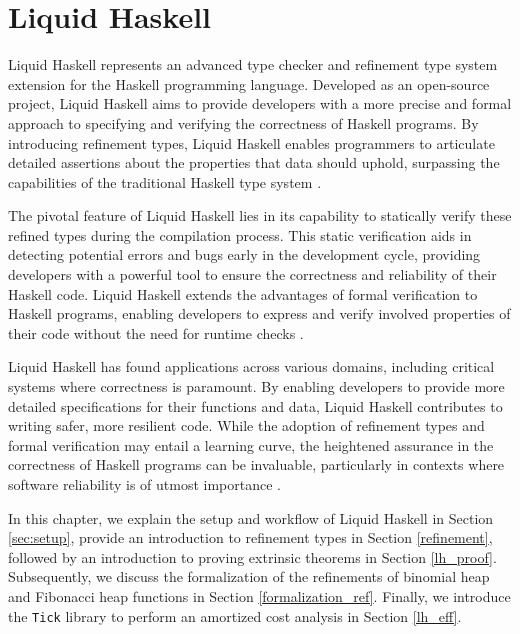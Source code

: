 \documentclass{clmthesis}
\begin{document}

\chapter{Liquid Haskell}
Liquid Haskell represents an advanced type checker and refinement type system extension for the Haskell programming language. Developed as an open-source project, Liquid Haskell aims to provide developers with a more precise and formal approach to specifying and verifying the correctness of Haskell programs. By introducing refinement types, Liquid Haskell enables programmers to articulate detailed assertions about the properties that data should uphold, surpassing the capabilities of the traditional Haskell type system \cite{vazou2014liquidhaskell}.

The pivotal feature of Liquid Haskell lies in its capability to statically verify these refined types during the compilation process. This static verification aids in detecting potential errors and bugs early in the development cycle, providing developers with a powerful tool to ensure the correctness and reliability of their Haskell code. Liquid Haskell extends the advantages of formal verification to Haskell programs, enabling developers to express and verify involved properties of their code without the need for runtime checks \cite{pena2017}.

Liquid Haskell has found applications across various domains, including critical systems where correctness is paramount. By enabling developers to provide more detailed specifications for their functions and data, Liquid Haskell contributes to writing safer, more resilient code. While the adoption of refinement types and formal verification may entail a learning curve, the heightened assurance in the correctness of Haskell programs can be invaluable, particularly in contexts where software reliability is of utmost importance \cite{vazou2014liquidhaskell}.

In this chapter, we explain the setup and workflow of Liquid Haskell in Section \ref{sec:setup}, provide an introduction to refinement types in Section \ref{refinement}, followed by an introduction to proving extrinsic theorems in Section \ref{lh_proof}. Subsequently, we discuss the formalization of the refinements of binomial heap and Fibonacci heap functions in Section \ref{formalization_ref}. Finally, we introduce the \texttt{Tick} library to perform an amortized cost analysis in Section \ref{lh_eff}.
\end{document}
